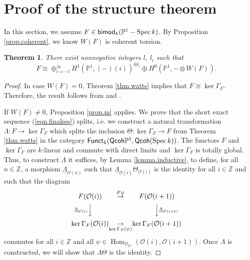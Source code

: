\documentclass[10pt]{amsart}
\newtheorem{thm}[lemma]{Theorem}
\theoremstyle{definition}
\theoremstyle{remark}
\numberwithin{equation}{section}
\begin{document}
\section{Proof of the structure theorem}
In this section, we assume $F \in {\sf bimod}_{k}(\mathbb{P}^{1}-\operatorname{Spec }k)$.  By Proposition \ref{prop.coherent}, we know $W(F)$ is coherent torsion.
\begin{thm} \label{thm.extension}
There exist nonnegative integers $l$, $l_{i}$ such that
$$
F \cong \oplus_{i=-l}^\infty {H}^{1}(\mathbb{P}^{1},(-)(i))^{\oplus l_{i}} \oplus H^{0}(\mathbb{P}^{1},-\otimes W(F)).
$$
\end{thm}

\begin{proof}
In case $W(F)=0$, Theorem \ref{thm.watts} implies that $F \cong {\operatorname{ker }\Gamma_{F}}$.  Therefore, the result follows from \cite[Lemma 7.2]{N} and \cite[Theorem 7.12]{N}.

If $W(F) \neq 0$, Proposition \ref{prop.m} applies.  We prove that the short exact sequence (\ref{eqn.finalses}) splits, i.e. we construct a natural transformation $\Lambda:F \rightarrow {\operatorname{ker }\Gamma_{F}}$ which splits the inclusion $\Theta: {\operatorname{ker }\Gamma_{F}} \rightarrow F$ from Theorem \ref{thm.watts} in the category ${\sf Funct}_{k}({\sf Qcoh }\mathbb{P}^{1},{\sf Qcoh }(\operatorname{Spec }k))$.  The functors $F$ and ${\operatorname{ker }\Gamma_{F}}$ are $k$-linear and commute with direct limits and ${\operatorname{ker }\Gamma_{F}}$ is totally global.  Thus, to construct $\Lambda$ it suffices, by Lemma \ref{lemma.inductive}, to define, for all $n \in \mathbb{Z}$, a morphism $\underline{\Lambda}_{\mathcal{O}(n)}$ such that $\underline{\Lambda}_{\mathcal{O}(i)} \Theta_{\mathcal{O}(i)}$ is the identity for all $i \in \mathbb{Z}$ and such that the diagram
\begin{equation} \label{eqn.taucommute}
\begin{CD}
F(\mathcal{O}(i)) & \overset{F\psi}{\rightarrow} & F(\mathcal{O}(i+1)) \\
@V{\underline{\Lambda}_{\mathcal{O}(i)}}VV @VV{\underline{\Lambda}_{\mathcal{O}(i+1)}}V \\
{\operatorname{ker }\Gamma_{F}}(\mathcal{O}(i)) & \underset{{\operatorname{ker }\Gamma_{F}} (\psi)}{\rightarrow} & {\operatorname{ker }\Gamma_{F}}(\mathcal{O}(i+1))
\end{CD}
\end{equation}
commutes for all $i \in \mathbb{Z}$ and all $\psi \in \operatorname{Hom}_{\mathcal{O}_{\mathbb{P}^{1}}}(\mathcal{O}(i),\mathcal{O}(i+1))$.  Once $\Lambda$ is constructed, we will show that $\Lambda \Theta$ is the identity.


\end{proof}
\end{document}
